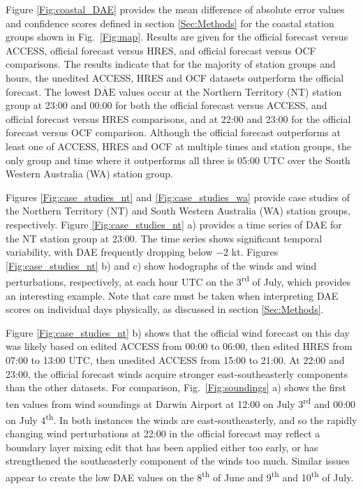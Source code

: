 \documentclass{ametsoc}
\begin{document}
Figure \ref{Fig:coastal_DAE} provides the mean difference of absolute error values and confidence scores defined in section \ref{Sec:Methods} for the coastal station groups shown in Fig.~\ref{Fig:map}. Results are given for the official forecast versus ACCESS, official forecast versus HRES, and official forecast versus OCF comparisons. The results indicate that for the majority of station groups and hours, the unedited ACCESS, HRES and OCF datasets outperform the official forecast. The lowest $\overline{\text{DAE}}$ values occur at the Northern Territory (NT) station group at 23:00 and 00:00 for both the official forecast versus ACCESS, and official forecast versus HRES comparisons, and at 22:00 and 23:00 for the official forecast versus OCF comparison. Although the official forecast outperforms at least one of ACCESS, HRES and OCF at multiple times and station groups, the only group and time where it outperforms all three is 05:00 UTC over the South Western Australia (WA) station group.

Figures \ref{Fig:case_studies_nt} and \ref{Fig:case_studies_wa} provide case studies of the Northern Territory (NT) and South Western Australia (WA) station groups, respectively. Figure \ref{Fig:case_studies_nt} a) provides a time series of DAE for the NT station group at 23:00. The time series shows significant temporal variability, with DAE frequently dropping below $-2$ kt. Figures \ref{Fig:case_studies_nt} b) and c) show hodographs of the winds and wind perturbations, respectively, at each hour UTC on the 3\textsuperscript{rd} of July, which provides an interesting example. Note that care must be taken when interpreting DAE scores on individual days physically, as discussed in section \ref{Sec:Methods}. 

Figure \ref{Fig:case_studies_nt} b) shows that the official wind forecast on this day was likely based on edited ACCESS from 00:00 to 06:00, then edited HRES from 07:00 to 13:00 UTC, then unedited ACCESS from 15:00 to 21:00. At 22:00 and 23:00, the official forecast winds acquire stronger east-southeasterly components than the other datasets. For comparison, Fig.~\ref{Fig:soundings} a) shows the first ten values from wind soundings at Darwin Airport at 12:00 on July 3\textsuperscript{rd} and 00:00 on July 4\textsuperscript{th}. In both instances the winds are east-southeasterly, and so the rapidly changing wind perturbations at 22:00 in the official forecast may reflect a boundary layer mixing edit that has been applied either too early, or has strengthened the southeasterly component of the winds too much. Similar issues appear to create the low DAE values on the 8\textsuperscript{th} of June and 9\textsuperscript{th} and 10\textsuperscript{th} of July.
\end{document}
